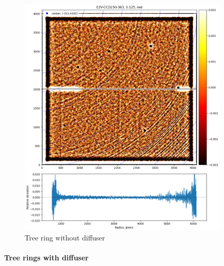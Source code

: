 \begin{figure}
\begin{centering}
\includegraphics[width=0.9\textwidth]{sections/figures/TR_wo_diffuser.png}
\end{centering}
\caption{Tree ring without diffuser}
\end{figure}

\paragraph{Tree rings with diffuser}

